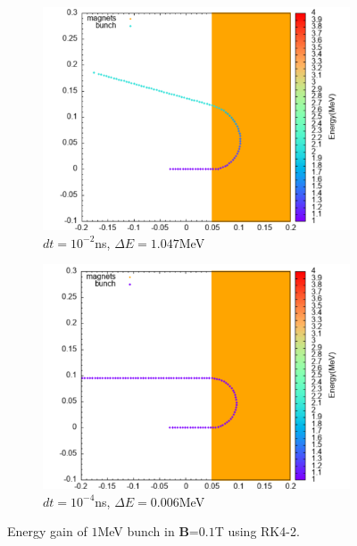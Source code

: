 \documentclass[a4paper,oneside,12pt]{report}
\numberwithin{equation}{chapter}
\begin{document}
{\iffalse \begin{figure}[H]
    \centering
    \begin{subfigure}{0.9\textwidth}
        \centering
        \includegraphics[width=\linewidth]{./figures/rhodoSim/mag_rk_001dt.png}
        \caption*{$dt=10^{-2}$ns, $\Delta E=1.047$MeV}
    \end{subfigure}
    \begin{subfigure}{0.9\textwidth}
        \centering
        \includegraphics[width=\linewidth]{./figures/rhodoSim/mag_rk_00001dt.png}
        \caption*{$dt=10^{-4}$ns, $\Delta E=0.006$MeV}
    \end{subfigure}
    \caption{Energy gain of $1$MeV bunch in \textbf{B}=$0.1$T using RK4-2.}

\end{figure}}
\end{document}
